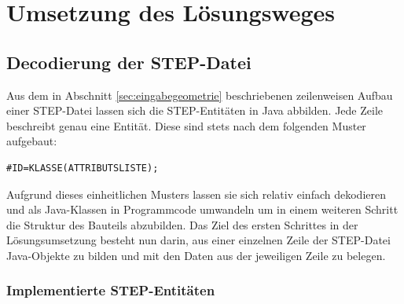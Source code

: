 \section{Umsetzung des Lösungsweges}
\label{sec:umsetzung}

\subsection{Decodierung der STEP-Datei}

Aus dem in Abschnitt \ref{sec:eingabegeometrie} beschriebenen zeilenweisen Aufbau einer STEP-Datei lassen sich die STEP-Entitäten in Java abbilden. Jede Zeile beschreibt genau eine Entität. Diese sind stets nach dem folgenden Muster aufgebaut:

\begin{lstlisting}[captionpos=b, style=customc, caption=Beschreibung eines Punktes in STEP, label=lst:simplestp]
#ID=KLASSE(ATTRIBUTSLISTE);
\end{lstlisting}

Aufgrund dieses einheitlichen Musters lassen sie sich relativ einfach dekodieren und als Java-Klassen in Programmcode umwandeln um in einem weiteren Schritt die Struktur des Bauteils abzubilden.
Das Ziel des ersten Schrittes in der Lösungsumsetzung besteht nun darin, aus einer einzelnen Zeile der STEP-Datei Java-Objekte zu bilden und mit den Daten aus der jeweiligen Zeile zu belegen.    

\subsubsection{Implementierte STEP-Entitäten}

